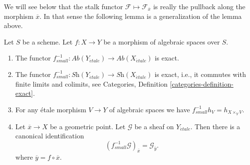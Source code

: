 \noindent
We will see below that the stalk functor
$\mathcal{F} \mapsto \mathcal{F}_{\overline{x}}$
is really the pullback along the morphism $\overline{x}$. In that sense
the following lemma is a generalization of the lemma above.

\begin{lemma}
\label{lemma-stalk-pullback}
Let $S$ be a scheme.
Let $f : X \to Y$ be a morphism of algebraic spaces over $S$.
\begin{enumerate}
\item The functor
$f_{small}^{-1} :
\textit{Ab}(Y_{\acute{e}tale})
\to
\textit{Ab}(X_{\acute{e}tale})$
is exact.
\item The functor
$f_{small}^{-1} :
\textit{Sh}(Y_{\acute{e}tale})
\to
\textit{Sh}(X_{\acute{e}tale})$
is exact, i.e., it commutes with finite limits and colimits, see
Categories, Definition \ref{categories-definition-exact}.
\item For any \'etale morphism $V \to Y$ of algebraic spaces
we have $f_{small}^{-1}h_V = h_{X \times_Y V}$.
\item Let $\overline{x} \to X$ be a geometric point.
Let $\mathcal{G}$ be a sheaf on $Y_{\acute{e}tale}$.
Then there is a canonical identification
$$
(f_{small}^{-1}\mathcal{G})_{\overline{x}} = \mathcal{G}_{\overline{y}}.
$$
where $\overline{y} = f \circ \overline{x}$.
\end{enumerate}
\end{lemma}

